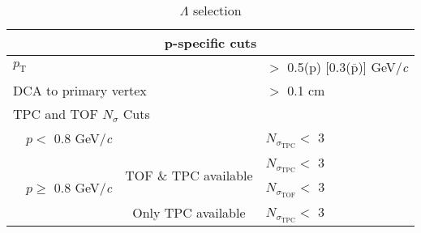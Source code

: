 \documentclass[ALICE,manyauthors]{cernphprep}
\newcommand{\Lam}{$\Lambda$\xspace}
\begin{document}
\begin{table}[htbp]
\begin{tabular}{lc|c|l}
   
   \multicolumn{4}{c}{\textbf{p-specific cuts}} \\
   \hline
   \multicolumn{3}{l|}{$p_{\mathrm{T}}$} & $ > $ 0.5(p) [0.3($\overline{\mathrm{p}}$)] GeV/\textit{c} \\
   \hline
   \multicolumn{3}{l|}{DCA to primary vertex} & $>$ 0.1 cm \\
   \hline
   \multicolumn{4}{l}{TPC and TOF $N_{\sigma}$ Cuts} \\
   \cline{2-4}
    & \multicolumn{1}{c}{$p <$ 0.8 GeV/\textit{c}} & & $N_{\sigma_{\mathrm{TPC}}} <$ 3 \\
   \cline{2-4}
    & \multicolumn{1}{c}{\multirow{3}{*}{$p \geq$ 0.8 GeV/\textit{c}}} &  \multirow{2}{*}{TOF \& TPC available} & $N_{\sigma_{\mathrm{TPC}}} <$ 3 \\
    & \multicolumn{2}{c|}{} & $N_{\sigma_{\mathrm{TOF}}} <$ 3 \\
   \cline{3-4}
    & \multicolumn{1}{c}{} & Only TPC available & $N_{\sigma_{\mathrm{TPC}}} <$ 3 \\
   \hline   
  \end{tabular}
 \caption{\Lam selection}
 \label{tab:LamCuts} 
\end{table}
\end{document}
